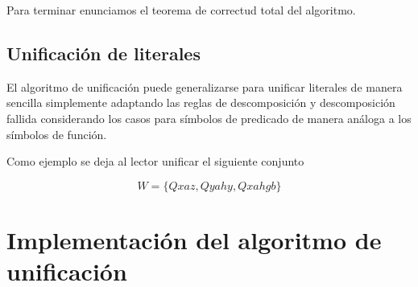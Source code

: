 \documentclass[11pt,letterpaper]{article}
\begin{document}
Para terminar enunciamos el teorema de correctud total del algoritmo.



\subsection{Unificación de literales}

El algoritmo de unificación puede generalizarse para unificar literales de 
manera sencilla simplemente adaptando las reglas de descomposición y 
descomposición fallida considerando los casos para símbolos de predicado de 
manera análoga a los símbolos de función.

Como ejemplo se deja al lector unificar el siguiente conjunto

\[
W=\{Qxaz,Qyahy,Qxahgb\}
\]


\section{Implementación del algoritmo de unificación}
\end{document}
